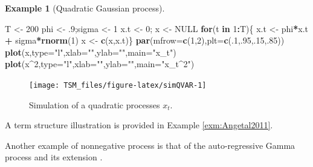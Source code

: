 \documentclass[
  12pt,
]{book}
\newenvironment{Shaded}{\begin{snugshade}}{\end{snugshade}}
\newcommand{\AttributeTok}[1]{\textcolor[rgb]{0.13,0.29,0.53}{#1}}
\newcommand{\ConstantTok}[1]{\textcolor[rgb]{0.56,0.35,0.01}{#1}}
\newcommand{\ControlFlowTok}[1]{\textcolor[rgb]{0.13,0.29,0.53}{\textbf{#1}}}
\newcommand{\DecValTok}[1]{\textcolor[rgb]{0.00,0.00,0.81}{#1}}
\newcommand{\FunctionTok}[1]{\textcolor[rgb]{0.13,0.29,0.53}{\textbf{#1}}}
\newcommand{\NormalTok}[1]{#1}
\newcommand{\OtherTok}[1]{\textcolor[rgb]{0.56,0.35,0.01}{#1}}
\newcommand{\SpecialCharTok}[1]{\textcolor[rgb]{0.81,0.36,0.00}{\textbf{#1}}}
\newcommand{\StringTok}[1]{\textcolor[rgb]{0.31,0.60,0.02}{#1}}
\theoremstyle{definition}
\theoremstyle{definition}
\newtheorem{example}{Example}[chapter]
\theoremstyle{definition}
\theoremstyle{definition}
\theoremstyle{remark}
\begin{document}
\begin{example}[Quadratic Gaussian process]
\begin{Shaded}
\begin{Highlighting}[]
\NormalTok{T }\OtherTok{\textless{}{-}} \DecValTok{200}
\NormalTok{phi }\OtherTok{\textless{}{-}}\NormalTok{ .}\DecValTok{9}\NormalTok{;sigma }\OtherTok{\textless{}{-}} \DecValTok{1}
\NormalTok{x.t }\OtherTok{\textless{}{-}} \DecValTok{0}\NormalTok{; x }\OtherTok{\textless{}{-}} \ConstantTok{NULL}
\ControlFlowTok{for}\NormalTok{(t }\ControlFlowTok{in} \DecValTok{1}\SpecialCharTok{:}\NormalTok{T)\{}
\NormalTok{  x.t }\OtherTok{\textless{}{-}}\NormalTok{ phi}\SpecialCharTok{*}\NormalTok{x.t }\SpecialCharTok{+}\NormalTok{ sigma}\SpecialCharTok{*}\FunctionTok{rnorm}\NormalTok{(}\DecValTok{1}\NormalTok{)}
\NormalTok{  x }\OtherTok{\textless{}{-}} \FunctionTok{c}\NormalTok{(x,x.t)\}}
\FunctionTok{par}\NormalTok{(}\AttributeTok{mfrow=}\FunctionTok{c}\NormalTok{(}\DecValTok{1}\NormalTok{,}\DecValTok{2}\NormalTok{),}\AttributeTok{plt=}\FunctionTok{c}\NormalTok{(.}\DecValTok{1}\NormalTok{,.}\DecValTok{95}\NormalTok{,.}\DecValTok{15}\NormalTok{,.}\DecValTok{85}\NormalTok{))}
\FunctionTok{plot}\NormalTok{(x,}\AttributeTok{type=}\StringTok{"l"}\NormalTok{,}\AttributeTok{xlab=}\StringTok{""}\NormalTok{,}\AttributeTok{ylab=}\StringTok{""}\NormalTok{,}\AttributeTok{main=}\StringTok{"x\_t"}\NormalTok{)}
\FunctionTok{plot}\NormalTok{(x}\SpecialCharTok{\^{}}\DecValTok{2}\NormalTok{,}\AttributeTok{type=}\StringTok{"l"}\NormalTok{,}\AttributeTok{xlab=}\StringTok{""}\NormalTok{,}\AttributeTok{ylab=}\StringTok{""}\NormalTok{,}\AttributeTok{main=}\StringTok{"x\_t\^{}2"}\NormalTok{)}
\end{Highlighting}
\end{Shaded}

\begin{figure}
\texttt{[image: TSM\_files/figure-latex/simQVAR-1]} \caption{Simulation of a quadratic processes $x_t$.}\label{fig:simQVAR}
\end{figure}

A term structure illustration is provided in Example \ref{exm:Angetal2011}.
\end{example}

Another example of nonnegative process is that of the auto-regressive Gamma process \citep{Gourieroux_Jasiak_2006} and its extension \citep{zarg_2017}.
\end{document}
